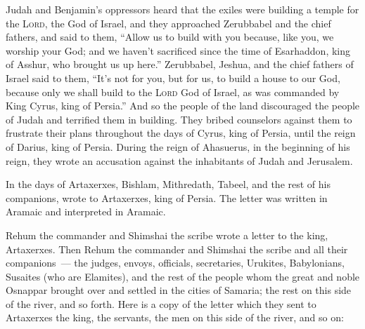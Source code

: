 
\begin{inparaenum}
     Judah and Benjamin's oppressors heard that the exiles were building a temple for the \textsc{Lord}, the God of Israel,%
     and they approached Zerubbabel and the chief fathers, and said to them, ``Allow us to build with you because, like you, we worship your God; and we haven't sacrificed since the time of Esarhaddon, king of Asshur, who brought us up here.''%
     Zerubbabel, Jeshua, and the chief fathers of Israel said to them, ``It's not for you, but for us, to build a house to our God, because only we shall build to the \textsc{Lord} God of Israel, as was commanded by King Cyrus, king of Persia.''%
     And so the people of the land discouraged the people of Judah and terrified them in building.%
     They bribed counselors against them to frustrate their plans throughout the days of Cyrus, king of Persia, until the reign of Darius, king of Persia.%
     During the reign of Ahasuerus, in the beginning of his reign, they wrote an accusation against the inhabitants of Judah and Jerusalem.%
    
     In the days of Artaxerxes, Bishlam, Mithredath, Tabeel, and the rest of his companions, wrote to Artaxerxes, king of Persia. The letter was written in Aramaic and interpreted in Aramaic.%
    
     Rehum the commander and Shimshai the scribe wrote a letter to the king, Artaxerxes.%
     Then Rehum the commander and Shimshai the scribe and all their companions~--- the judges, envoys, officials, secretaries, Urukites, Babylonians, Susaites (who are Elamites),%
     and the rest of the people whom the great and noble Osnappar brought over and settled in the cities of Samaria; the rest on this side of the river, and so forth.%
     Here is a copy of the letter which they sent to Artaxerxes the king, the servants, the men on this side of the river, and so on:%
    

\end{inparaenum}
